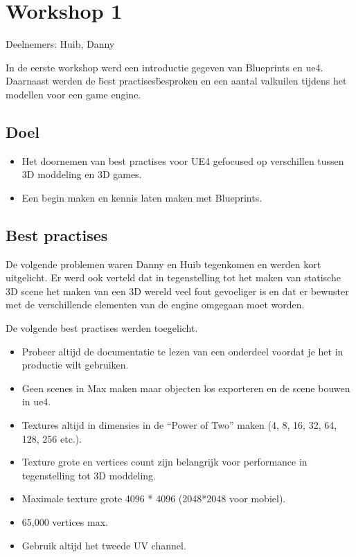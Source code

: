 
\chapter{Workshop 1}
\lhead{}
Deelnemers: Huib, Danny

In de eerste workshop werd een introductie gegeven van Blueprints en \gls{ue4}.
Daarnaast werden de \"best practises\" besproken en een aantal valkuilen tijdens het modellen voor een game engine.

\section{Doel}
\begin{itemize}
	\item Het doornemen van best practises voor UE4 gefocused op verschillen tussen 3D moddeling en 3D games. 
	\item Een begin maken en kennis laten maken met Blueprints.
\end{itemize}

\section{Best practises}
De volgende problemen waren Danny en Huib tegenkomen en werden kort uitgelicht. Er werd ook verteld dat in tegenstelling tot het maken van statische 3D scene het maken van een 3D wereld veel fout gevoeliger is en dat er bewuster met de verschillende elementen van de engine omgegaan moet worden.

De volgende best practises werden toegelicht.
\begin{itemize}
	\item Probeer altijd de documentatie te lezen van een onderdeel voordat je het in productie wilt gebruiken.
	\item Geen scenes in Max maken maar objecten los exporteren en de scene bouwen in \gls{ue4}.
	\item Textures altijd in dimensies in de “Power of Two” maken (4, 8, 16, 32, 64, 128, 256 etc.).
	\item Texture grote en vertices count zijn belangrijk voor performance in tegenstelling tot 3D moddeling.
	\item Maximale texture grote 4096 * 4096 (2048*2048 voor mobiel).
	\item 65,000 vertices max.
	\item Gebruik altijd het tweede UV channel.
\end{itemize}


